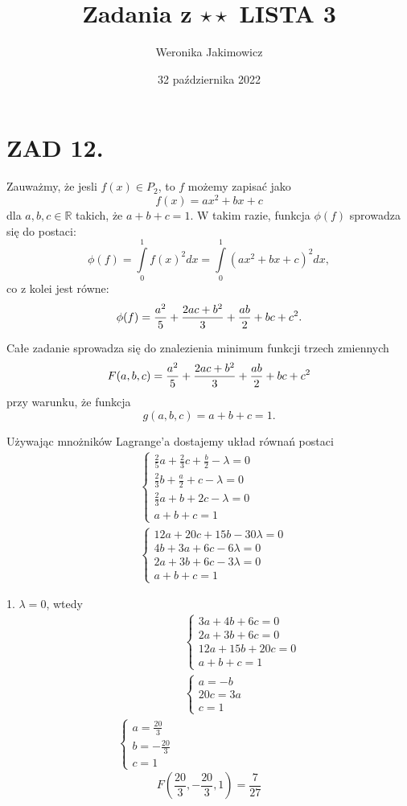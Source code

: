 \documentclass{article}[13pt]
\author{Weronika Jakimowicz}
\title{Zadania z $\star\star$ LISTA 3}
\date{32 października 2022}
\newcommand{\R}{\mathds{R}}
\begin{document}
    \maketitle

    \section*{ZAD 12.}

    Zauważmy, że jesli $f(x)\in P_2$, to $f$ możemy zapisać jako
    $$f(x)=ax^2+bx+c$$
    dla $a,b,c\in\R$ takich, że $a+b+c=1$. W takim razie, funkcja $\phi(f)$ sprowadza się do postaci:
    $$\phi(f)=\int\limits_0^1f(x)^2dx=\int\limits_0^1(ax^2+bx+c)^2dx,$$
    co z kolei jest równe:
    $$\phi(f)={a^2\over5}+{2ac+b^2\over3}+{ab\over2}+bc+c^2.$$

    Całe zadanie sprowadza się do znalezienia minimum funkcji trzech zmiennych
    $$F(a,b,c)={a^2\over5}+{2ac+b^2\over3}+{ab\over2}+bc+c^2$$
    przy warunku, że funkcja
    $$g(a,b,c)=a+b+c=1.$$

    Używając mnożników Lagrange'a dostajemy układ równań postaci
    \begin{align*}
        &\begin{cases}
            \frac25a+\frac23c+\frac b2-\lambda=0\\
            \frac23b+\frac a2+c-\lambda=0\\
            \frac23a+b+2c-\lambda=0\\
            a+b+c=1
        \end{cases}\\
        &\begin{cases}
            12a+20c+15b-30\lambda=0\\
            4b+3a+6c-6\lambda=0\\
            2a+3b+6c-3\lambda=0\\
            a+b+c=1
        \end{cases}
    \end{align*}

    {\color{def}1. $\lambda=0$}, wtedy
    \begin{align*}
        &\begin{cases}
            3a+4b+6c=0\\
            2a+3b+6c=0\\
            12a+15b+20c=0\\
            a+b+c=1
        \end{cases}\\
        &\begin{cases}
            a=-b\\
            20c=3a\\
            c=1
        \end{cases}\\
        \begin{cases}
            a=\frac{20}3\\
            b=-\frac{20}3\\
            c=1
        \end{cases}
    \end{align*}
        $$F(\frac{20}3,-\frac{20}3,1)=\frac7{27}$$
\end{document}

